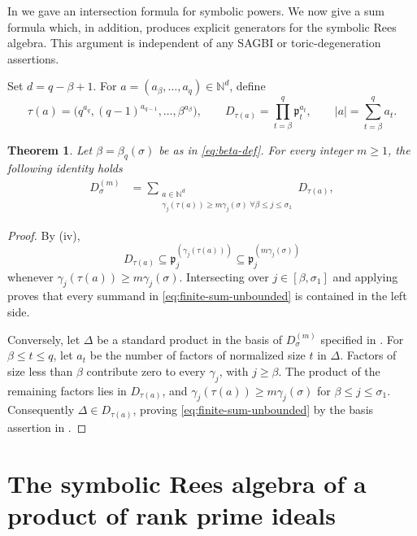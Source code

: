 \documentclass[11pt,reqno]{amsart}
\numberwithin{equation}{subsection}
\newtheorem{theorem}[equation]{Theorem}
\theoremstyle{definition}
\theoremstyle{remark}
\newcommand{\fp}{\mathfrak p}
\begin{document}
In  we gave an intersection formula for symbolic powers.  We now give a sum formula which, in addition,
produces explicit generators for the symbolic Rees algebra. This argument is independent of any
SAGBI or toric-degeneration assertions.

Set $d=q-\beta+1$. For $a=(a_\beta,\ldots,a_q)\in\mathbb{N}^d$, define
\[
  \tau(a)=\bigl(q^{a_q},(q-1)^{a_{q-1}},\ldots,\beta^{a_\beta}\bigr),
  \qquad
  D_{\tau(a)}=\prod_{t=\beta}^{q}\mathfrak{p}_t^{a_t},
  \qquad
  |a|=\sum_{t=\beta}^{q}a_t.
\]

\begin{theorem}\label{thm:finite-sum-unbounded}
Let $\beta=\beta_q(\sigma)$ be as in \eqref{eq:beta-def}. For every integer $m\ge1$, the following identity holds
\begin{align}
  D_\sigma^{(m)}
    &=\sum_{\substack{a\in\mathbb{N}^d\\ \gamma_j(\tau(a)) \geq m\gamma_j(\sigma) \; \forall \beta\leq j\leq \sigma_1}}
    D_{\tau(a)},   \label{eq:finite-sum-unbounded}
    \end{align}
    \end{theorem}

\begin{proof}
  By (iv),
\[
D_{\tau(a)}
  \subseteq \fp_j^{(\gamma_j(\tau(a)))}
  \subseteq \fp_j^{(m\gamma_j(\sigma))}
\]
whenever $\gamma_j(\tau(a))\ge m\gamma_j(\sigma)$. 
Intersecting over $j\in [\beta, \sigma_1]$ and applying   proves that every
summand in \eqref{eq:finite-sum-unbounded} is contained in the left side.

Conversely, let $\Delta$ be a standard product in the basis of $D_\sigma^{(m)}$ specified in  . For $\beta\leq t\leq q$, let
$a_t$ be the number of factors of normalized size $t$ in $\Delta$. Factors of size less than $\beta$
contribute zero to every $\gamma_j$, with $j\geq \beta$.  The product of the remaining factors
lies in $D_{\tau(a)}$, and
$\gamma_j(\tau(a))\ge m\gamma_j(\sigma)$ for
$\beta\le j\le\sigma_1$.
Consequently $\Delta\in D_{\tau(a)}$, proving
\eqref{eq:finite-sum-unbounded} by the basis assertion in  .
\end{proof}


\section{The symbolic Rees algebra of a product of rank prime ideals}\label{sec:Rees}
\end{document}
